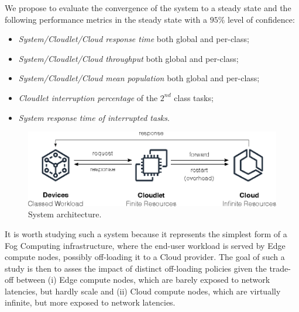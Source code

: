 We propose to evaluate the convergence of the system to a steady state and the following performance metrics in the steady state with a $95\%$ level of confidence:

\begin{itemize}
	\item \textit{System/Cloudlet/Cloud response time} both global and per-class;
	
	\item \textit{System/Cloudlet/Cloud throughput} both global and per-class;
	
	\item \textit{System/Cloudlet/Cloud mean population} both global and per-class;
	
	\item \textit{Cloudlet interruption percentage} of the $2^{nd}$ class tasks;
	
	\item \textit{System response time of interrupted tasks}.
\end{itemize}

\begin{figure}
	\includegraphics[width=\columnwidth]{fig/architecture}
	\caption{System architecture.}
	\label{fig:system-architecture}
\end{figure}

It is worth studying such a system because it represents the simplest form of a Fog Computing infrastructure, where the end-user workload is  served by Edge compute nodes,  possibly off-loading it to a Cloud provider. The goal of such a study is then to asses the impact of distinct off-loading policies given the trade-off between (i) Edge compute nodes, which are barely exposed to network latencies, but hardly scale and (ii) Cloud compute nodes,  which are virtually infinite, but more exposed to network latencies.